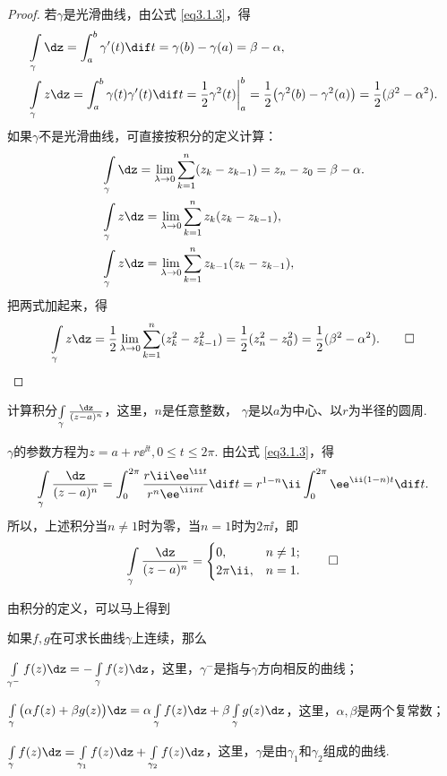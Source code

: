 \begin{proof}
  若$\gamma$是光滑曲线，由公式 \eqref{eq3.1.3}，得
  \begin{align*}
    & \int\limits_\gamma \dz = \int_a^b\gamma'(t)\dif t=\gamma(b)-\gamma(a)=\beta-\alpha,\\
    & \int\limits_\gamma z\dz = \int_a^b\gamma(t)\gamma'(t)\dif t
      = \frac12\gamma^2(t)\bigg|_a^b = \frac12\big(\gamma^2(b)-\gamma^2(a)\big)
      = \frac12(\beta^2-\alpha^2).
  \end{align*}
  如果$\gamma$不是光滑曲线，可直接按积分的定义计算：
  \begin{align*}
  &\int\limits_\gamma\dz=\lim_{\lambda\to0}\sum_{k=1}^n(z_k-z_{k-1})
  =z_n-z_0=\beta-\alpha.\\
  &\int\limits_\gamma z\dz=\lim_{\lambda\to0}\sum_{k=1}^nz_k(z_k-z_{k-1}),\\
  &\int\limits_\gamma z\dz=\lim_{\lambda\to0}\sum_{k=1}^nz_{k-1}(z_k-z_{k-1}),
  \end{align*}
  把两式加起来，得
  \begin{equation*}
    \int\limits_\gamma z\dz=\frac12\lim_{\lambda\to0}
    \sum_{k=1}^n(z_k^2-z_{k-1}^2)=\frac12(z_n^2-z_0^2)=\frac12(\beta^2-\alpha^2). \qedhere
  \end{equation*}
\end{proof}

\begin{example}\label{exam3.1.4}
计算积分$\int\limits_\gamma\frac{\dz}{(z-a)^n}$，这里，$n$是任意整数，
$\gamma$是以$a$为中心、以$r$为半径的圆周.
\end{example}
\begin{solution}
$\gamma$的参数方程为$z=a+r\ee^{\ii t},0\le t\le2\pi$. 由公式 \eqref{eq3.1.3}，得
\[\int\limits_\gamma\frac{\dz}{(z-a)^n}=\int_0^{2\pi}\frac{r\ii\ee^{\ii t}}{r^n\ee^{\ii nt}}\dif t=r^{1-n}\ii\int_0^{2\pi}\ee^{\ii(1-n)t}\dif t.\]
所以，上述积分当$n\ne1$时为零，当$n=1$时为$2\pi\ii$，即
\begin{equation*}\int\limits_\gamma\frac{\dz}{(z-a)^n}=\begin{cases}
0,&n\ne1;\\
2\pi\ii,&n=1.
\end{cases} \qedhere
\end{equation*}
\end{solution}

由积分的定义，可以马上得到
\begin{prop}\label{prop3.1.5}
如果$f,g$在可求长曲线$\gamma$上连续，那么
\begin{eenum}
  \item \label{prop3.1.5.1} $\int\limits_{\gamma^-}f(z)\dz=-\int\limits_\gamma f(z)\dz$，这里，$\gamma^-$是指与$\gamma$方向相反的曲线；
  \item \label{prop3.1.5.2} $\int\limits_\gamma\big(\alpha f(z)+\beta g(z)\big)\dz
  =\alpha\int\limits_\gamma f(z)\dz+\beta\int\limits_\gamma g(z)\dz$，这里，$\alpha,\beta$是两个复常数；
  \item \label{prop3.1.5.3} $\int\limits_\gamma f(z)\dz=\int\limits_{\gamma_1}f(z)\dz+\int\limits_{\gamma_2}f(z)\dz$，这里，$\gamma$是由$\gamma_1$和$\gamma_2$组成的曲线.
\end{eenum}
\end{prop}

